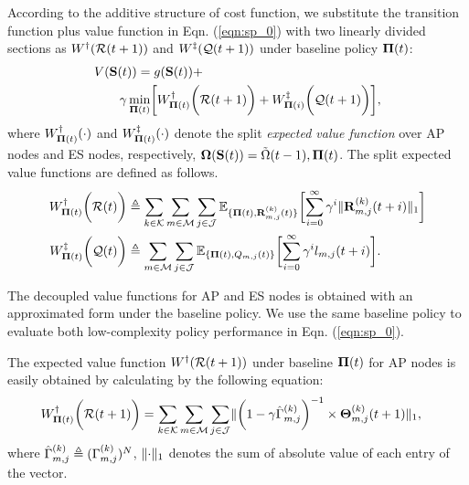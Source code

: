 According to the additive structure of cost function, we substitute the transition function plus value function in Eqn. (\ref{eqn:sp_0}) with two linearly divided sections as $W^{\dagger}(\mathcal{R}(t+1))$ and $W^{\ddagger}(\mathcal{Q}(t+1))$ under baseline policy $\boldsymbol{\Pi}(t)$:
\begin{align}
    &V(\Stat(t)) = g(\Stat(t)) +
    \nonumber\\
    &~~~~~~\gamma \min_{\BaseLine(t)} \Bracket{ W^{\AP}_{\BaseLine(t)}\Paren{\mathcal{R}(t+1)} + W^{\ES}_{\BaseLine({i})}\Paren{\mathcal{Q}(t+1)} },
\end{align}
where $W^{\dagger}_{\boldsymbol{\Pi}(t)}(\cdot)$ and $W^{\ddagger}_{\boldsymbol{\Pi}(t)}(\cdot)$ denote the split \emph{expected value function} over AP nodes and ES nodes, respectively, $\boldsymbol{\Omega}(\mathbf{S}(t)) = \tilde{\Omega}({t-1}), \boldsymbol{\Pi}(t)$. The split expected value functions are defined as follows.
\begin{align}
    W^{\AP}_{\BaseLine(t)}\Paren{\mathcal{R}(t)}
        &\define \sum_{k\in\apSet}\sum_{m\in\esSet}\sum_{j\in\jSpace}
        \mathbb{E}_{\{\BaseLine(t), \vec{R}^{(k)}_{m,j}(t)\}}\Bracket{
            \sum_{i=0}^{\infty} \gamma^{i} \Inorm{\vec{R}^{(k)}_{m,j}({t+i})}
        }
    \\
    W^{\ES}_{\BaseLine(t)}\Paren{\mathcal{Q}(t)}
        &\define \sum_{m\in\esSet}\sum_{j\in\jSpace}
        \mathbb{E}_{\{\BaseLine(t), Q_{m,j}(t)\}}\Bracket{
            \sum_{i=0}^{\infty} \gamma^{i} l_{m,j}({t+i})
        }.
\end{align}
        
The decoupled value functions for AP and ES nodes is obtained with an approximated form under the baseline policy. We use the same baseline policy to evaluate both low-complexity policy performance in Eqn. (\ref{eqn:sp_0}).

The expected value function $W^{\dagger}(\mathcal{R}(t+1))$ under baseline $\boldsymbol{\Pi}(t)$ for AP nodes is easily obtained by calculating by the following equation:
\begin{align}
    &W^{\dagger}_{\boldsymbol{\Pi}(t)}\bigg(\mathcal{R}(t+1)\bigg) = \sum_{k\in\mathcal{K}}\sum_{m\in\mathcal{M}}\sum_{j\in\mathcal{J}}
    \lVert
        \bigg(1 - \gamma \hat{\Gamma}^{(k)}_{m,j}\bigg)^{-1}
        \times \boldsymbol{\Theta}^{(k)}_{m,j}(t+1)
    \|_1,
    \label{w_ap}
\end{align}
where $\hat{\Gamma}^{(k)}_{m,j} \triangleq (\Gamma^{(k)}_{m,j})^{N}$, $\lVert\cdot\|_1$ denotes the sum of absolute value of each entry of the vector.

